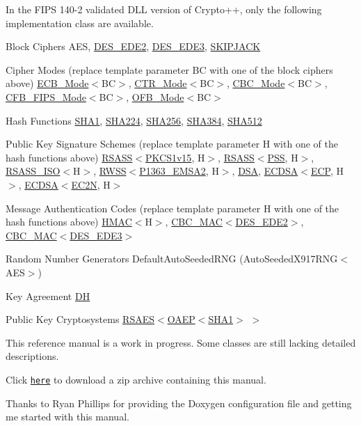 In the FIPS 140-\/2 validated DLL version of Crypto++, only the following implementation class are available. 
\begin{DoxyDescription}
\item[Block Ciphers]AES, \hyperlink{class_d_e_s___e_d_e2}{DES\_\-EDE2}, \hyperlink{class_d_e_s___e_d_e3}{DES\_\-EDE3}, \hyperlink{class_s_k_i_p_j_a_c_k}{SKIPJACK} 
\item[Cipher Modes (replace template parameter BC with one of the block ciphers above)]\hyperlink{struct_e_c_b___mode}{ECB\_\-Mode}$<$BC$>$, \hyperlink{struct_c_t_r___mode}{CTR\_\-Mode}$<$BC$>$, \hyperlink{struct_c_b_c___mode}{CBC\_\-Mode}$<$BC$>$, \hyperlink{struct_c_f_b___f_i_p_s___mode}{CFB\_\-FIPS\_\-Mode}$<$BC$>$, \hyperlink{struct_o_f_b___mode}{OFB\_\-Mode}$<$BC$>$ 
\item[Hash Functions]\hyperlink{class_s_h_a1}{SHA1}, \hyperlink{class_s_h_a224}{SHA224}, \hyperlink{class_s_h_a256}{SHA256}, \hyperlink{class_s_h_a384}{SHA384}, \hyperlink{class_s_h_a512}{SHA512} 
\item[Public Key Signature Schemes (replace template parameter H with one of the hash functions above)]\hyperlink{struct_r_s_a_s_s}{RSASS}$<$\hyperlink{struct_p_k_c_s1v15}{PKCS1v15}, H$>$, \hyperlink{struct_r_s_a_s_s}{RSASS}$<$\hyperlink{struct_p_s_s}{PSS}, H$>$, \hyperlink{struct_r_s_a_s_s___i_s_o}{RSASS\_\-ISO}$<$H$>$, \hyperlink{struct_r_w_s_s}{RWSS}$<$\hyperlink{struct_p1363___e_m_s_a2}{P1363\_\-EMSA2}, H$>$, \hyperlink{struct_d_s_a}{DSA}, \hyperlink{struct_e_c_d_s_a}{ECDSA}$<$\hyperlink{class_e_c_p}{ECP}, H$>$, \hyperlink{struct_e_c_d_s_a}{ECDSA}$<$\hyperlink{class_e_c2_n}{EC2N}, H$>$ 
\item[Message Authentication Codes (replace template parameter H with one of the hash functions above)]\hyperlink{class_h_m_a_c}{HMAC}$<$H$>$, \hyperlink{class_c_b_c___m_a_c}{CBC\_\-MAC}$<$\hyperlink{class_d_e_s___e_d_e2}{DES\_\-EDE2}$>$, \hyperlink{class_c_b_c___m_a_c}{CBC\_\-MAC}$<$\hyperlink{class_d_e_s___e_d_e3}{DES\_\-EDE3}$>$ 
\item[Random Number Generators]DefaultAutoSeededRNG (AutoSeededX917RNG$<$AES$>$) 
\item[Key Agreement]\hyperlink{dh_8h_ad6400f70a2f740693b62d66d59171a32}{DH} 
\item[Public Key Cryptosystems]\hyperlink{struct_r_s_a_e_s}{RSAES}$<$\hyperlink{class_o_a_e_p}{OAEP}$<$\hyperlink{class_s_h_a1}{SHA1}$>$ $>$ 
\end{DoxyDescription}

This reference manual is a work in progress. Some classes are still lacking detailed descriptions. 

Click \href{CryptoPPRef.zip}{\tt here} to download a zip archive containing this manual. 

Thanks to Ryan Phillips for providing the Doxygen configuration file and getting me started with this manual. 